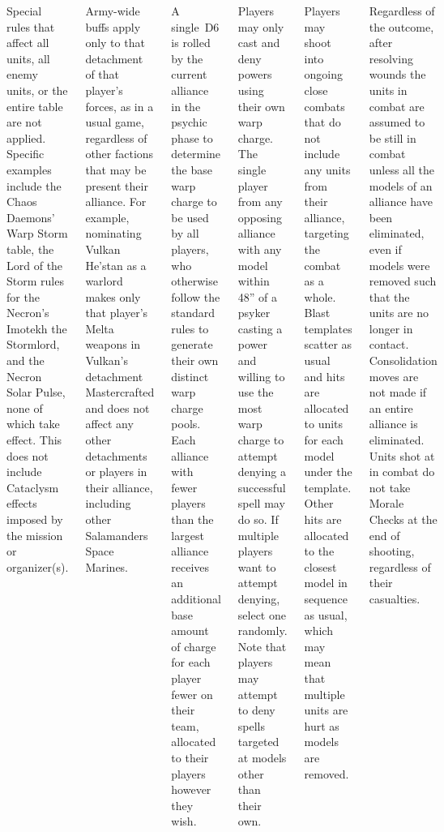 \documentclass{40k}
\begin{document}
\begin{columns}

Special rules that affect all units, all enemy units, or the entire
table are not applied.  Specific examples include the Chaos Daemons'
Warp Storm table, the Lord of the Storm rules for the Necron's Imotekh
the Stormlord, and the Necron Solar Pulse, none of which take effect.
This does not include Cataclysm effects imposed by the mission or
organizer(s).

Army-wide buffs apply only to that detachment of that player's forces,
as in a usual game, regardless of other factions that may be present
their alliance.  For example, nominating Vulkan He'stan as a warlord
makes only that player's Melta weapons in Vulkan's detachment
Mastercrafted and does not affect any other detachments or players in
their alliance, including other Salamanders Space Marines.


A single~D6 is rolled by the current alliance in the psychic phase to
determine the base warp charge to be used by all players, who
otherwise follow the standard rules to generate their own distinct
warp charge pools.  Each alliance with fewer players than the largest
alliance receives an additional base amount of charge for each player
fewer on their team, allocated to their players however they wish.

Players may only cast and deny powers using their own warp charge.
The single player from any opposing alliance with any model within
48'' of a psyker casting a power and willing to use the most warp
charge to attempt denying a successful spell may do so.  If multiple
players want to attempt denying, select one randomly.  Note that
players may attempt to deny spells targeted at models other than their
own.



Players may shoot into ongoing close combats that do not include any
units from their alliance, targeting the combat as a whole.  Blast
templates scatter as usual and hits are allocated to units for each
model under the template.  Other hits are allocated to the closest
model in sequence as usual, which may mean that multiple units are
hurt as models are removed.

Regardless of the outcome, after resolving wounds the units in combat
are assumed to be still in combat unless all the models of an alliance
have been eliminated, even if models were removed such that the units
are no longer in contact.  Consolidation moves are not made if an
entire alliance is eliminated.  Units shot at in combat do not take
Morale Checks at the end of shooting, regardless of their casualties.



\end{columns}
\end{document}

